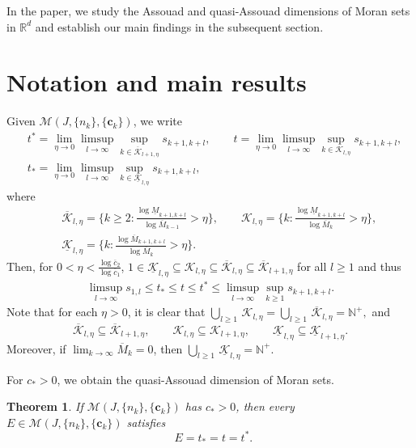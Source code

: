 \documentclass[12pt]{amsart}
\numberwithin{equation}{section}
\theoremstyle{plain}
\newtheorem{theorem}{Theorem}[section]
\theoremstyle{remark}
\theoremstyle{definition}
\newcommand{\ok}{\overline{\mathcal{K}}}
\newcommand{\kk}{\mathcal{K}}
\newcommand{\uk}{\underline{\mathcal{K}}}
\newcommand{\om}{\overline{M}}
\newcommand{\um}{\underline{M}}
\newcommand{\N}{\mathbb{N}}
\newcommand{\ccc}{\mathbf{c}}
\newcommand{\f}{\frac}
\newcommand{\oc}{\overline{c}}
\renewcommand{\ge}{\geqslant}
\renewcommand{\le}{\leqslant}
\renewcommand{\geq}{\geqslant}
\DeclareMathOperator{\dimqa}{dim_{qA}}
\begin{document}
	
	
	
	In the paper, we study the Assouad and quasi-Assouad dimensions of Moran sets in $\mathbb{R}^{d}$ and establish our main findings in the subsequent section.
	
	
	
	
	\section{Notation and main results}
	Given   $\mathcal{M}(J,\{n_k\},\{\ccc_k\})$, we  write
	\begin{equation}\label{def_t*tt*}
		\begin{split}
			&t^*=\lim_{\eta\to 0}\limsup_{l\to\infty} \sup_{k\in \ok_{l+1,\eta}} s_{k+1,k+l}, \qquad
			t=\lim_{\eta\to 0}\limsup_{l\to\infty}\sup_{k\in \kk_{l,\eta}} s_{k+1,k+l}, \\
			&t_*=\lim_{\eta\to 0}\limsup_{l\to\infty}\sup_{k\in \uk_{l,\eta}} s_{k+1,k+l}, 
		\end{split}
	\end{equation}
	where
	\begin{eqnarray*}
		&&\ok_{l,\eta}=\Big\{k\ge 2:\frac{\log \um_{k+1,k+l}}{\log \om_{k-1}}>\eta\Big\}, \qquad \kk_{l,\eta}=\Big\{k:\frac{\log \um_{k+1,k+l}}{\log \om_{k}}>\eta\Big\},\\
		&&\uk_{l,\eta}=\Big\{k:\frac{\log \om_{k+1,k+l}}{\log \om_{k}}>\eta\Big\}. 
	\end{eqnarray*}
Then, for $0<\eta<\f{\log \oc_2}{\log \oc_1}$, $1\in\uk_{l,\eta}\subseteq\kk_{l,\eta}\subseteq\ok_{l,\eta}\subseteq\ok_{l+1,\eta}$ for all $l\geq 1$ and thus
	\begin{align*}
		\limsup_{l\to\infty}s_{1,l}\le t_*\le  t\le t^*\le \limsup_{l\to\infty}\sup_{k\ge1} s_{k+1,k+l}.
	\end{align*}
Note that for each $\eta>0$, it is clear that  $	\bigcup_{l\ge 1}\,\kk_{l,\eta}=\bigcup_{l\ge 1}\,\ok_{l,\eta}=\N^+,$ and 
		\[
		\ok_{l,\eta}\subseteq\ok_{l+1,\eta},\qquad\kk_{l,\eta}\subseteq\kk_{l+1,\eta},\qquad \uk_{l,\eta}\subseteq\uk_{l+1,\eta} . 
		\]
		Moreover, if $\lim_{k\to\infty} \om_k=0$, then 
		$ \bigcup_{l\ge 1}\,\uk_{l,\eta}=\N^+. $

	
	
	
	For $c_*>0$, we obtain  the quasi-Assouad dimension of Moran sets.
	\begin{theorem}\label{no.1}
If $\mathcal{M}(J,\{n_k\},\{\ccc_k\})$  has $c_*>0$, then every $E\in\mathcal{M}(J,\{n_k\},\{\ccc_k\})$ satisfies
		\[
		\dimqa E=t_*=  t= t^*.
		\]
	\end{theorem}
	
\end{document}
